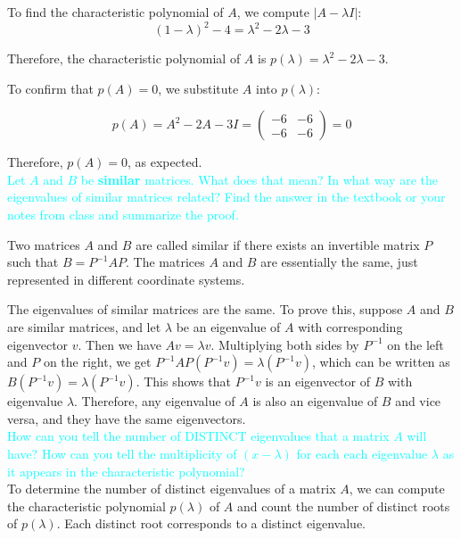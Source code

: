 \documentclass[fontsize=12pt]{scrartcl}
\begin{document}
\noindent
To find the characteristic polynomial of $A$, we compute $|A - \lambda I|$:
$$ (1-\lambda)^2 - 4 = \lambda^2 - 2\lambda -3 $$

\noindent
Therefore, the characteristic polynomial of $A$ is $p(\lambda) = \lambda^2 - 2\lambda - 3$.

\noindent
To confirm that $p(A) = 0$, we substitute $A$ into $p(\lambda)$:

$$p(A)  = A^2 - 2A -3I = \left( \begin{array}{cc} -6 & -6 \\ -6 & -6 \end{array} \right) = 0$$

\noindent
Therefore, $p(A) = 0$, as expected.
\\

\noindent
\textcolor{cyan}{Let $A$ and $B$ be \textbf{similar} matrices. What does that mean? In what way are the eigenvalues of similar matrices related? Find the answer in the textbook or your notes from class and summarize the proof.}

\noindent
Two matrices $A$ and $B$ are called similar if there exists an invertible matrix $P$ such that $B = P^{-1}AP$. The matrices $A$ and $B$ are essentially the same, just represented in different coordinate systems.

\noindent
The eigenvalues of similar matrices are the same. To prove this, suppose $A$ and $B$ are similar matrices, and let $\lambda$ be an eigenvalue of $A$ with corresponding eigenvector $v$. Then we have $Av = \lambda v$. Multiplying both sides by $P^{-1}$ on the left and $P$ on the right, we get $P^{-1}AP(P^{-1}v) = \lambda(P^{-1}v)$, which can be written as $B(P^{-1}v) = \lambda(P^{-1}v)$. This shows that $P^{-1}v$ is an eigenvector of $B$ with eigenvalue $\lambda$. Therefore, any eigenvalue of $A$ is also an eigenvalue of $B$ and vice versa, and they have the same eigenvectors.
\\

\noindent
\textcolor{cyan}{How can you tell the number of DISTINCT eigenvalues that a matrix $A$ will have? How can you tell the multiplicity of $(x - \lambda)$ for each each eigenvalue $\lambda$ as it appears in the characteristic polynomial?}\\

\noindent
To determine the number of distinct eigenvalues of a matrix $A$, we can compute the characteristic polynomial $p(\lambda)$ of $A$ and count the number of distinct roots of $p(\lambda)$. Each distinct root corresponds to a distinct eigenvalue.
\end{document}
